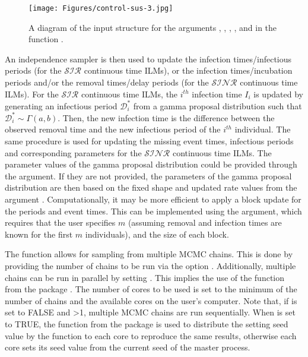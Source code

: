 \documentclass[nojss,shortnames]{jss}
\begin{document}
\begin{figure}[!h]
\begin{center}
\texttt{[image: Figures/control-sus-3.jpg]}
\caption{A diagram of the input structure for the arguments , , , ,  and  in the function .}
\label{diagram-epictmcmc}
\end{center}
\end{figure}

An independence sampler is then used to update the infection times/infectious periods (for the $\mathcal{SIR}$ continuous time ILMs), or the infection times/incubation periods and/or the removal times/delay periods (for the $\mathcal{SINR}$ continuous time ILMs). For the $\mathcal{SIR}$ continuous time ILMs, the $i^{th}$ infection time $I_{i}$ is updated by generating an infectious period $\mathcal{D}^{*}_{i}$ from a gamma proposal distribution such that $\mathcal{D}^{*}_{i}\sim \Gamma(a,b)$. Then, the new infection time is the difference between the observed removal time and the new infectious period of the $i^{th}$ individual. The same procedure is used for updating the missing event times, infectious periods and corresponding parameters for the $\mathcal{SINR}$ continuous time ILMs. The parameter values of the gamma proposal distribution could be provided through the  argument. If they are not provided, the parameters of the gamma proposal distribution are then based on the fixed shape and updated rate values from the argument .
Computationally, it may be more efficient to apply a block update for the periods and event times. This can be implemented using the  argument, which requires that the user specifies $m$ (assuming removal and infection times are known for the first $m$ individuals), and the size of each block. 


The  function allows for sampling from multiple MCMC chains. This is done by providing the number of chains to be run via the option . Additionally, multiple chains can be run in parallel by setting . This implies the use of the  function from the  package \citep{CRAN}. The number of cores to be used is set to the minimum of the number of chains and the available cores on the user's computer. Note that, if  is set to FALSE and >1, multiple MCMC chains are run sequentially. When  is set to TRUE, the  function from the  package \citep{CRAN} is used to distribute the setting seed value by the  function \citep{CRAN} to each core to reproduce the same results, otherwise each core sets its seed value from the current seed of the master process.
\end{document}
